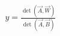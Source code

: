 \documentclass[preview]{standalone}
\begin{document}
\begin{align*}
y = \frac{\det(\vec{A}, \vec{W})}{\det(\vec{A}, \vec{B})}
\end{align*}
\end{document}

